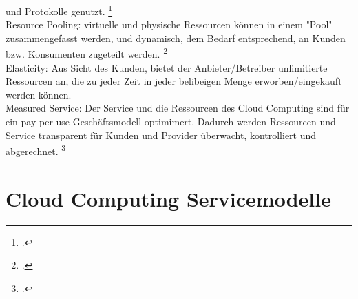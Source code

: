 \documentclass[12pt,toc=bib,toc=listof]{scrreprt}
\begin{document}
und Protokolle genutzt. \footcite [Vgl.] []{Dangelo.2015} \\
Resource Pooling: virtuelle und physische Ressourcen können in einem "Pool" zusammengefasst werden,
 und dynamisch, dem Bedarf entsprechend, an Kunden bzw. Konsumenten zugeteilt werden. \footcite [Vgl.] []{Dangelo.2015} \\
Elasticity: Aus Sicht des Kunden, bietet der Anbieter/Betreiber unlimitierte Ressourcen an,
 die zu jeder Zeit in jeder belibeigen Menge erworben/eingekauft werden können. \\
Measured Service: Der Service und die Ressourcen des Cloud Computing sind für ein pay per use Geschäftsmodell optimimert.
 Dadurch werden Ressourcen und Service transparent für Kunden und Provider überwacht, kontrolliert und abgerechnet. \footcite [Vgl.] []{Dangelo.2015}

\section{Cloud Computing Servicemodelle} %
\label{sec:Cloud Computing Servicemodelle}
\end{document}
